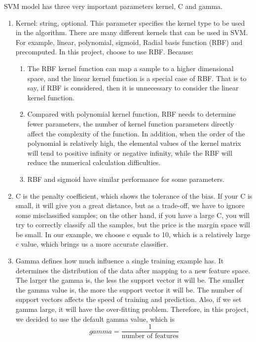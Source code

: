 \documentclass[sigconf]{acmart}
\begin{document}
SVM model has three very important parameters kernel, C and gamma\cite{sklearn.svm}. 
\begin{enumerate}
    \item Kernel: string, optional. This parameter specifies the kernel type to be used in the algorithm. There are many different kernels that can be used in SVM. For example, linear, polynomial, sigmoid, Radial basis function (RBF) and precomputed. In this project, choose to use RBF. Because:
    \begin{enumerate}
        \item The RBF kernel function can map a sample to a higher dimensional space, and the linear kernel function is a special case of RBF. That is to say, if RBF is considered, then it is unnecessary to consider the linear kernel function.
        \item Compared with polynomial kernel function, RBF needs to determine fewer parameters, the number of kernel function parameters directly affect the complexity of the function. In addition, when the order of the polynomial is relatively high, the elemental values of the kernel matrix will tend to positive infinity or negative infinity, while the RBF will reduce the numerical calculation difficulties.
        \item RBF and sigmoid have similar performance for some parameters.
    \end{enumerate}
    \item C is the penalty coefficient, which shows the tolerance of the bias. If your C is small, it will give you a great distance, but as a trade-off, we have to ignore some misclassified samples; on the other hand, if you have a large C, you will try to correctly classify all the samples, but the price is the margin space will be small. In our example, we choose c equals to 10, which is a relatively large c value, which brings us a more accurate classifier. 
    \item Gamma defines how much influence a single training example has. It determines the distribution of the data after mapping to a new feature space. The larger the gamma is, the less the support vector it will be. The smaller the gamma value is, the more the support vector it will be. The number of support vectors affects the speed of training and prediction. Also, if we set gamma large, it will have the over-fitting problem. Therefore, in this project, we decided to use the default gamma value, which is 
    \begin{equation*}
     gamma=\frac{1}{\text{number of features}}
    \end{equation*}
\end{enumerate}
\end{document}
